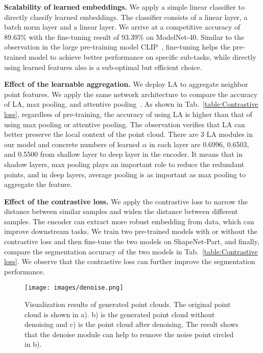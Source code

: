 \documentclass[journal]{IEEEtran}
\begin{document}
\textbf{Scalability of learned embeddings.} We apply a simple linear classifier to directly classify learned embeddings. The classifier consists of a linear layer, a batch norm layer and a linear layer. We arrive at a competitive accuracy of 89.63\% with the fine-tuning result of 93.39\% on ModelNet-40. Similar to the observation in the large pre-training model CLIP~\cite{radford2021learning}, fine-tuning helps the pre-trained model to achieve better performance on specific sub-tasks, while directly using learned features also is a sub-optimal but efficient choice.



\textbf{Effect of the learnable aggregation.} We deploy LA to aggregate neighbor point features. We apply the same network architecture to compare the accuracy of LA, max pooling, and attentive pooling~\cite{hu2020randla}. As shown in Tab.~\ref{table:Contrastive loss}, regardless of pre-training, the accuracy of using LA is higher than that of using max pooling or attentive pooling. 
The observation verifies that LA can better preserve the local context of the point cloud. There are 3 LA modules in our model and concrete numbers of learned $\alpha$ in each layer are  0.6996, 0.6503, and 0.5500 from shallow layer to deep layer in the encoder. It means that in shadow layers, max pooling plays an important role to reduce the redundant points, and in deep layers, average pooling is as important as max pooling to aggregate the feature.

\textbf{Effect of the contrastive loss.}
We apply the contrastive loss to narrow the distance between similar samples and widen the distance between different samples. The encoder can extract more robust embedding from data, which can improve downstream tasks. We train two pre-trained models with or without the contrastive loss and then fine-tune the two models on ShapeNet-Part, and finally, compare the segmentation accuracy of the two models in Tab.~\ref{table:Contrastive loss}. We observe that the contrastive loss can further improve the segmentation performance. 


\begin{figure}[t]
\begin{center}
\texttt{[image: images/denoise.png]}
\end{center}
\vspace{-.15in}
   \caption{Visualization results of generated point clouds. The original point cloud is shown in a). b) is the generated point cloud without denoising and c) is the point cloud after denoising. The result shows that the denoise module can help to remove the noise point circled in b).}
\label{fig:denoise}
\end{figure}
\end{document}
